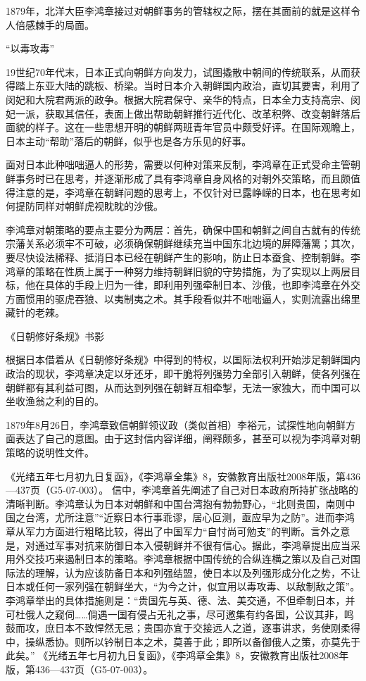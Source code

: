 \documentclass[12pt,UTF8]{ctexbook}
\begin{document}
1879年，北洋大臣李鸿章接过对朝鲜事务的管辖权之际，摆在其面前的就是这样令人倍感棘手的局面。

“以毒攻毒”

19世纪70年代末，日本正式向朝鲜方向发力，试图撬散中朝间的传统联系，从而获得踏上东亚大陆的跳板、桥梁。当时日本介入朝鲜国内政治，直切其要害，利用了闵妃和大院君两派的政争。根据大院君保守、亲华的特点，日本全力支持高宗、闵妃一派，获取其信任，表面上做出帮助朝鲜推行近代化、改革积弊、改变朝鲜落后面貌的样子。这在一些思想开明的朝鲜两班青年官员中颇受好评。在国际观瞻上，日本主动“帮助”落后的朝鲜，似乎也是各方乐见的好事。

面对日本此种咄咄逼人的形势，需要以何种对策来反制，李鸿章在正式受命主管朝鲜事务时已在思考，并逐渐形成了具有李鸿章自身风格的对朝外交策略，而且颇值得注意的是，李鸿章在朝鲜问题的思考上，不仅针对已露峥嵘的日本，也在思考如何提防同样对朝鲜虎视眈眈的沙俄。

李鸿章对朝策略的要点主要分为两层：首先，确保中国和朝鲜之间自古就有的传统宗藩关系必须牢不可破，必须确保朝鲜继续充当中国东北边境的屏障藩篱；其次，要尽快设法稀释、抵消日本已经在朝鲜产生的影响，防止日本蚕食、控制朝鲜。李鸿章的策略在性质上属于一种努力维持朝鲜旧貌的守势措施，为了实现以上两层目标，他在具体的手段上归为一律，即利用列强牵制日本、沙俄，也即李鸿章在外交方面惯用的驱虎吞狼、以夷制夷之术。其手段看似并不咄咄逼人，实则流露出绵里藏针的老辣。


《日朝修好条规》书影

根据日本借着从《日朝修好条规》中得到的特权，以国际法权利开始涉足朝鲜国内政治的现状，李鸿章决定以牙还牙，即干脆将列强势力全部引入朝鲜，使各列强在朝鲜都有其利益可图，从而达到列强在朝鲜互相牵掣，无法一家独大，而中国可以坐收渔翁之利的目的。

1879年8月26日，李鸿章致信朝鲜领议政（类似首相）李裕元，试探性地向朝鲜方面表达了自己的意图。由于这封信内容详细，阐释颇多，甚至可以视为李鸿章对朝策略的说明性文件。

《光绪五年七月初九日复函》，《李鸿章全集》8，安徽教育出版社2008年版，第436—437页（G5-07-003）。
信中，李鸿章首先阐述了自己对日本政府所持扩张战略的清晰判断。李鸿章认为日本对朝鲜和中国台湾抱有勃勃野心，“北则贵国，南则中国之台湾，尤所注意”“近察日本行事乖谬，居心叵测，亟应早为之防”。进而李鸿章从军力方面进行粗略比较，得出了中国军力“自忖尚可勉支”的判断。言外之意是，对通过军事对抗来防御日本入侵朝鲜并不很有信心。据此，李鸿章提出应当采用外交技巧来遏制日本的策略。李鸿章根据中国传统的合纵连横之策以及自己对国际法的理解，认为应该防备日本和列强结盟，使日本以及列强形成分化之势，不让日本或任何一家列强在朝鲜坐大，“为今之计，似宜用以毒攻毒、以敌制敌之策”。李鸿章举出的具体措施则是：“贵国先与英、德、法、美交通，不但牵制日本，并可杜俄人之窥伺……倘遇一国有侵占无礼之事，尽可邀集有约各国，公议其非，鸣鼓而攻，庶日本不致悍然无忌；贵国亦宜于交接远人之道，逐事讲求，务使刚柔得中，操纵悉协。则所以钤制日本之术，莫善于此；即所以备御俄人之策，亦莫先于此矣。” 《光绪五年七月初九日复函》，《李鸿章全集》8，安徽教育出版社2008年版，第436—437页（G5-07-003）。
\end{document}
